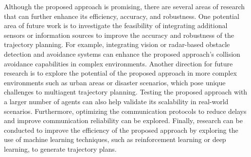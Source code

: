 Although the proposed approach is promising, there are several areas of research that can further enhance its efficiency, accuracy, and robustness. One potential area of future work is to investigate the feasibility of integrating additional sensors or information sources to improve the accuracy and robustness of the trajectory planning. For example, integrating vision or radar-based obstacle detection and avoidance systems can enhance the proposed approach's collision avoidance capabilities in complex environments. Another direction for future research is to explore the potential of the proposed approach in more complex environments such as urban areas or disaster scenarios, which pose unique challenges to multiagent trajectory planning. Testing the proposed approach with a larger number of agents can also help validate its scalability in real-world scenarios. Furthermore, optimizing the communication protocols to reduce delays and improve communication reliability can be explored. Finally, research can be conducted to improve the efficiency of the proposed approach by exploring the use of machine learning techniques, such as reinforcement learning or deep learning, to generate trajectory plans.